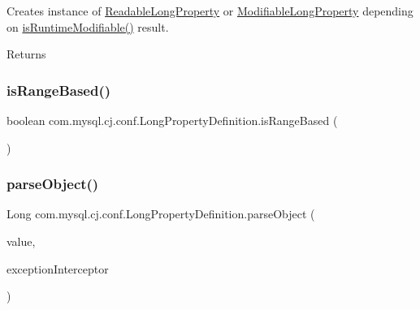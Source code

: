 Creates instance of \mbox{\hyperlink{classcom_1_1mysql_1_1cj_1_1conf_1_1_readable_long_property}{Readable\+Long\+Property}} or \mbox{\hyperlink{classcom_1_1mysql_1_1cj_1_1conf_1_1_modifiable_long_property}{Modifiable\+Long\+Property}} depending on \mbox{\hyperlink{classcom_1_1mysql_1_1cj_1_1conf_1_1_abstract_property_definition_a6c98140b2db84ccd0ff29ce165ec9ef5}{is\+Runtime\+Modifiable()}} result.

\begin{DoxyReturn}{Returns}

\end{DoxyReturn}
\mbox{\label{classcom_1_1mysql_1_1cj_1_1conf_1_1_long_property_definition_a1e21f3a02b25080e02efc8303361658e}} 
\subsubsection{\texorpdfstring{is\+Range\+Based()}{isRangeBased()}}
{\footnotesize\ttfamily boolean com.\+mysql.\+cj.\+conf.\+Long\+Property\+Definition.\+is\+Range\+Based (\begin{DoxyParamCaption}{ }\end{DoxyParamCaption})}

\mbox{\label{classcom_1_1mysql_1_1cj_1_1conf_1_1_long_property_definition_a2119fdeb715a2b39c165ca75cf509551}} 
\subsubsection{\texorpdfstring{parse\+Object()}{parseObject()}}
{\footnotesize\ttfamily Long com.\+mysql.\+cj.\+conf.\+Long\+Property\+Definition.\+parse\+Object (\begin{DoxyParamCaption}\item[{String}]{value,  }\item[{\mbox{\hyperlink{interfacecom_1_1mysql_1_1cj_1_1exceptions_1_1_exception_interceptor}{Exception\+Interceptor}}}]{exception\+Interceptor }\end{DoxyParamCaption})}



